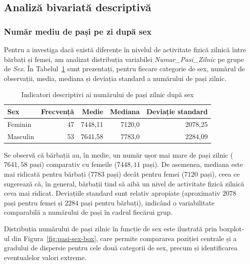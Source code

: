 \documentclass[12pt,a4paper]{report}
\begin{document}
\subsection{Analiză bivariată descriptivă}

\subsubsection{Număr mediu de pași pe zi după sex}

Pentru a investiga dacă există diferențe în nivelul de activitate fizică zilnică între bărbați și femei, am analizat distribuția variabilei \textit{Numar\_Pasi\_Zilnic} pe grupe de \textit{Sex}. În Tabelul~\ref{tab:pasi-sex} sunt prezentați, pentru fiecare categorie de sex, numărul de observații, media, mediana și deviația standard a numărului de pași zilnic.

\begin{table}[h!]
    \centering
    \caption{Indicatori descriptivi ai numărului de pași zilnic după sex}
    \label{tab:pasi-sex}
    \begin{tabular}{l r r r r}
        \hline
        \textbf{Sex} & \textbf{Frecvență} & \textbf{Medie} & \textbf{Mediana} & \textbf{Deviație standard} \\
        \hline
        Feminin  & 47 & 7448{,}11 & 7120{,}0 & 2078{,}25 \\
        Masculin & 53 & 7641{,}58 & 7783{,}0 & 2284{,}09 \\
        \hline
    \end{tabular}
\end{table}

Se observă că bărbații au, în medie, un număr ușor mai mare de pași zilnic (\(7641{,}58\) pași) comparativ cu femeile (\(7448{,}11\) pași). De asemenea, mediana este mai ridicată pentru bărbați (\(7783\) pași) decât pentru femei (\(7120\) pași), ceea ce sugerează că, în general, bărbații tind să aibă un nivel de activitate fizică zilnică ceva mai ridicat. Deviațiile standard sunt relativ apropiate (aproximativ \(2078\) pași pentru femei și \(2284\) pași pentru bărbați), indicând o variabilitate comparabilă a numărului de pași în cadrul fiecărui grup.

Distribuția numărului de pași zilnic în funcție de sex este ilustrată prin boxplot-ul din Figura~\ref{fig:pasi-sex-box}, care permite compararea poziției centrale și a gradului de dispersie pentru cele două categorii de sex, precum și identificarea eventualelor valori extreme.
\end{document}
